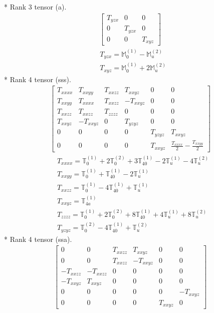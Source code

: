\documentclass[fleqn,8pt,landscape]{jsarticle}
\begin{document}
* Rank 3 tensor (a).
\begin{align*}
\begin{bmatrix} T_{yzx} & 0 & 0 \\ 0 & T_{yzx} & 0 \\ 0 & 0 & T_{xyz} \end{bmatrix}
\end{align*}
\begin{align*}
& T_{yzx} = \mathbb{M}_{0}^{(1)} - \mathbb{M}_{u}^{(2)} \\
& T_{xyz} = \mathbb{M}_{0}^{(1)} + 2 \mathbb{M}_{u}^{(2)}
\end{align*}
* Rank 4 tensor (sss).
\begin{align*}
\begin{bmatrix} T_{xxxx} & T_{xxyy} & T_{xxzz} & T_{xxyz} & 0 & 0 \\ T_{xxyy} & T_{xxxx} & T_{xxzz} & - T_{xxyz} & 0 & 0 \\ T_{xxzz} & T_{xxzz} & T_{zzzz} & 0 & 0 & 0 \\ T_{xxyz} & - T_{xxyz} & 0 & T_{yzyz} & 0 & 0 \\ 0 & 0 & 0 & 0 & T_{yzyz} & T_{xxyz} \\ 0 & 0 & 0 & 0 & T_{xxyz} & \frac{T_{xxxx}}{2} - \frac{T_{xxyy}}{2} \end{bmatrix}
\end{align*}
\begin{align*}
& T_{xxxx} = \mathbb{T}_{0}^{(1)} + 2 \mathbb{T}_{0}^{(2)} + 3 \mathbb{T}_{40}^{(1)} - 2 \mathbb{T}_{u}^{(1)} - 4 \mathbb{T}_{u}^{(2)} \\
& T_{xxyy} = \mathbb{T}_{0}^{(1)} + \mathbb{T}_{40}^{(1)} - 2 \mathbb{T}_{u}^{(1)} \\
& T_{xxzz} = \mathbb{T}_{0}^{(1)} - 4 \mathbb{T}_{40}^{(1)} + \mathbb{T}_{u}^{(1)} \\
& T_{xxyz} = \mathbb{T}_{4a}^{(1)} \\
& T_{zzzz} = \mathbb{T}_{0}^{(1)} + 2 \mathbb{T}_{0}^{(2)} + 8 \mathbb{T}_{40}^{(1)} + 4 \mathbb{T}_{u}^{(1)} + 8 \mathbb{T}_{u}^{(2)} \\
& T_{yzyz} = \mathbb{T}_{0}^{(2)} - 4 \mathbb{T}_{40}^{(1)} + \mathbb{T}_{u}^{(2)}
\end{align*}
* Rank 4 tensor (ssa).
\begin{align*}
\begin{bmatrix} 0 & 0 & T_{xxzz} & T_{xxyz} & 0 & 0 \\ 0 & 0 & T_{xxzz} & - T_{xxyz} & 0 & 0 \\ - T_{xxzz} & - T_{xxzz} & 0 & 0 & 0 & 0 \\ - T_{xxyz} & T_{xxyz} & 0 & 0 & 0 & 0 \\ 0 & 0 & 0 & 0 & 0 & - T_{xxyz} \\ 0 & 0 & 0 & 0 & T_{xxyz} & 0 \end{bmatrix}
\end{align*}
\end{document}
